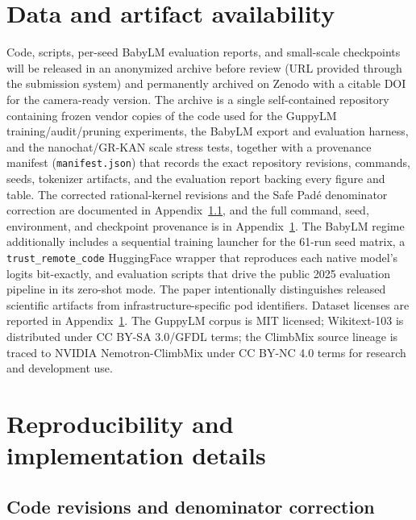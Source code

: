 \documentclass{article}
\newcommand{\modelname}[1]{\textsc{#1}}
\newcommand{\grkan}{\modelname{GR-KAN}}
\begin{document}
\section*{Data and artifact availability}

Code, scripts, per-seed BabyLM evaluation reports, and small-scale checkpoints will be released in an anonymized archive before review (URL provided through the submission system) and permanently archived on Zenodo with a citable DOI for the camera-ready version. The archive is a single self-contained repository containing frozen vendor copies of the code used for the GuppyLM training/audit/pruning experiments, the BabyLM export and evaluation harness, and the nanochat/\grkan{} scale stress tests, together with a provenance manifest (\texttt{manifest.json}) that records the exact repository revisions, commands, seeds, tokenizer artifacts, and the evaluation report backing every figure and table. The corrected rational-kernel revisions and the Safe Pad\'{e} denominator correction are documented in Appendix~\ref{app:coderev}, and the full command, seed, environment, and checkpoint provenance is in Appendix~\ref{app:reprod}. The BabyLM regime additionally includes a sequential training launcher for the 61-run seed matrix, a \texttt{trust\_remote\_code} HuggingFace wrapper that reproduces each native model's logits bit-exactly, and evaluation scripts that drive the public 2025 evaluation pipeline \citep{babylm2025eval} in its zero-shot mode. The paper intentionally distinguishes released scientific artifacts from infrastructure-specific pod identifiers. Dataset licenses are reported in Appendix~\ref{app:reprod}. The GuppyLM corpus is MIT licensed; Wikitext-103 is distributed under CC BY-SA 3.0/GFDL terms; the ClimbMix source lineage is traced to NVIDIA Nemotron-ClimbMix under CC BY-NC 4.0 terms for research and development use.

\appendix

\section{Reproducibility and implementation details}
\label{app:reprod}

\subsection{Code revisions and denominator correction}
\label{app:coderev}
\end{document}
